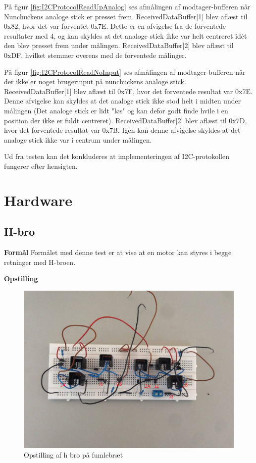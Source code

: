På figur \ref{fig:I2CProtocolReadUpAnalog} ses afmålingen af modtager-bufferen når Nunchuckens analoge stick er presset frem. ReceivedDataBuffer[1] blev aflæst til 0x82, hvor det var forventet 0x7E. Dette er en afvigelse fra de forventede resultater med 4, og kan skyldes at det analoge stick ikke var helt centreret idét den blev presset frem under målingen. ReceivedDataBuffer[2] blev aflæst til 0xDF, hvilket stemmer overens med de forventede målinger.

På figur \ref{fig:I2CProtocolReadNoInput} ses afmålingen af modtager-bufferen når der ikke er noget brugerinput på nunchuckens analoge stick. ReceivedDataBuffer[1] blev aflæst til 0x7F, hvor det forventede resultat var 0x7E. Denne afvigelse kan skyldes at det analoge stick ikke stod helt i midten under målingen (Det analoge stick er lidt "løs" og kan defor godt finde hvile i en position der ikke er fuldt centreret). ReceivedDataBuffer[2] blev aflæst til 0x7D, hvor det forventede resultat var 0x7B. Igen kan denne afvigelse skyldes at det analoge stick ikke var i centrum under målingen.

Ud fra testen kan det konkluderes at implementeringen af I2C-protokollen fungerer efter hensigten.

\section{Hardware}
\subsection{H-bro} 

\textbf{Formål} \newline
Formålet med denne test er at vise at en motor kan styres i begge retninger med H-broen.\newline

\noindent \textbf{Opstilling}

\begin{figure}[H]
	\centering
	\includegraphics[width=\textwidth]{test/images/testhbroopst}
	\caption{Opstilling af h bro på fumlebræt}
\end{figure}


